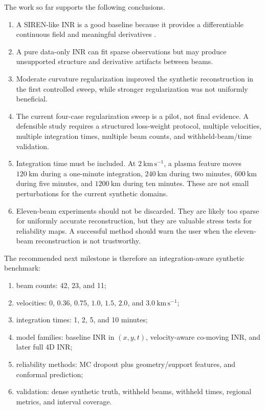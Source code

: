 \documentclass[11pt]{article}
\newcommand{\kmps}{\mathrm{km\,s^{-1}}}
\begin{document}
The work so far supports the following conclusions.
\begin{enumerate}[leftmargin=*]
  \item A SIREN-like INR is a good baseline because it provides a differentiable continuous field
  and meaningful derivatives \cite{Sitzmann2020SIREN}.
  \item A pure data-only INR can fit sparse observations but may produce unsupported structure
  and derivative artifacts between beams.
  \item Moderate curvature regularization improved the synthetic reconstruction in the first
  controlled sweep, while stronger regularization was not uniformly beneficial.
  \item The current four-case regularization sweep is a pilot, not final evidence. A defensible
  study requires a structured loss-weight protocol, multiple velocities, multiple integration
  times, multiple beam counts, and withheld-beam/time validation.
  \item Integration time must be included. At $2~\kmps$, a plasma feature moves $120~\mathrm{km}$
  during a one-minute integration, $240~\mathrm{km}$ during two minutes, $600~\mathrm{km}$
  during five minutes, and $1200~\mathrm{km}$ during ten minutes. These are not small
  perturbations for the current synthetic domains.
  \item Eleven-beam experiments should not be discarded. They are likely too sparse for uniformly
  accurate reconstruction, but they are valuable stress tests for reliability maps. A successful
  method should warn the user when the eleven-beam reconstruction is not trustworthy.
\end{enumerate}

The recommended next milestone is therefore an integration-aware synthetic benchmark:
\begin{enumerate}[leftmargin=*]
  \item beam counts: 42, 23, and 11;
  \item velocities: $0$, $0.36$, $0.75$, $1.0$, $1.5$, $2.0$, and $3.0~\kmps$;
  \item integration times: 1, 2, 5, and 10 minutes;
  \item model families: baseline INR in $(x,y,t)$, velocity-aware co-moving INR, and later
  full 4D INR;
  \item reliability methods: MC dropout plus geometry/support features, and conformal prediction;
  \item validation: dense synthetic truth, withheld beams, withheld times, regional metrics, and
  interval coverage.
\end{enumerate}
\end{document}
